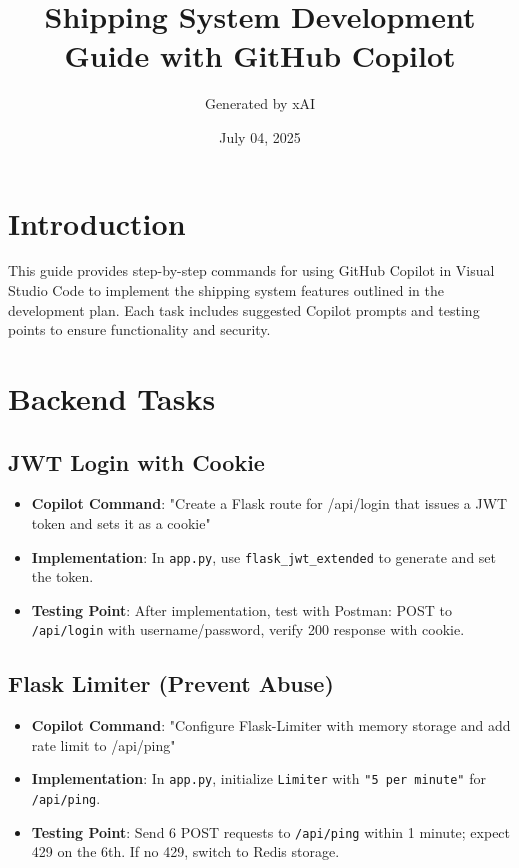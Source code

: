 \documentclass[a4paper,12pt]{article}
\title{Shipping System Development Guide with GitHub Copilot}
\author{Generated by xAI}
\date{July 04, 2025}
\begin{document}
\maketitle

\section{Introduction}
This guide provides step-by-step commands for using GitHub Copilot in Visual Studio Code to implement the shipping system features outlined in the development plan. Each task includes suggested Copilot prompts and testing points to ensure functionality and security.

\section{Backend Tasks}

\subsection{JWT Login with Cookie}
\begin{itemize}
    \item \textbf{Copilot Command}: "Create a Flask route for /api/login that issues a JWT token and sets it as a cookie"
    \item \textbf{Implementation}: In \texttt{app.py}, use \texttt{flask\_jwt\_extended} to generate and set the token.
    \item \textbf{Testing Point}: After implementation, test with Postman: POST to \texttt{/api/login} with username/password, verify 200 response with cookie.
\end{itemize}

\subsection{Flask Limiter (Prevent Abuse)}
\begin{itemize}
    \item \textbf{Copilot Command}: "Configure Flask-Limiter with memory storage and add rate limit to /api/ping"
    \item \textbf{Implementation}: In \texttt{app.py}, initialize \texttt{Limiter} with \texttt{"5 per minute"} for \texttt{/api/ping}.
    \item \textbf{Testing Point}: Send 6 POST requests to \texttt{/api/ping} within 1 minute; expect 429 on the 6th. If no 429, switch to Redis storage.
\end{itemize}
\end{document}
